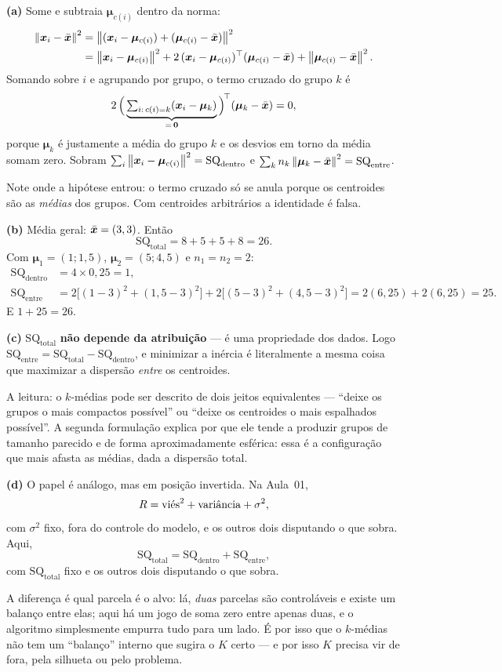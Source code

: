 \documentclass[11pt,a4paper]{article}
\begin{document}
\begin{solucao}
\textbf{(a)} Some e subtraia $\bm\mu_{c(i)}$ dentro da norma:
\[
\begin{aligned}
  \left\lVert \bm{x}_i-\bar{\bm{x}} \right\rVert^2 &= \left\lVert (\bm{x}_i-\bm\mu_{c(i)}) + (\bm\mu_{c(i)}-\bar{\bm{x}}) \right\rVert^2\\
  &= \left\lVert \bm{x}_i-\bm\mu_{c(i)} \right\rVert^2 + 2\,(\bm{x}_i-\bm\mu_{c(i)})^\top(\bm\mu_{c(i)}-\bar{\bm{x}})
    + \left\lVert \bm\mu_{c(i)}-\bar{\bm{x}} \right\rVert^2 .
\end{aligned}
\]
Somando sobre $i$ e agrupando por grupo, o termo cruzado do grupo $k$ é
\[
  2\,\Big(\underbrace{\textstyle\sum_{i:\,c(i)=k}(\bm{x}_i-\bm\mu_k)}_{=\,\bm 0}\Big)^{\!\top}
  (\bm\mu_k-\bar{\bm{x}}) = 0 ,
\]
porque $\bm\mu_k$ é justamente a média do grupo $k$ e os desvios em torno da
média somam zero. Sobram
$\sum_i\left\lVert \bm{x}_i-\bm\mu_{c(i)} \right\rVert^2 = \mathrm{SQ}_{\text{dentro}}$ e
$\sum_k n_k\left\lVert \bm\mu_k-\bar{\bm{x}} \right\rVert^2 = \mathrm{SQ}_{\text{entre}}$.

Note onde a hipótese entrou: o termo cruzado só se anula porque os centroides são
as \emph{médias} dos grupos. Com centroides arbitrários a identidade é falsa.

\smallskip
\textbf{(b)} Média geral: $\bar{\bm{x}} = (3,3)$. Então
\[
  \mathrm{SQ}_{\text{total}} = 8+5+5+8 = 26 .
\]
Com $\bm\mu_1=(1;1{,}5)$, $\bm\mu_2=(5;4{,}5)$ e $n_1=n_2=2$:
\[
\begin{aligned}
  \mathrm{SQ}_{\text{dentro}} &= 4\times 0{,}25 = 1,\\
  \mathrm{SQ}_{\text{entre}} &= 2\big[(1-3)^2+(1{,}5-3)^2\big] + 2\big[(5-3)^2+(4{,}5-3)^2\big]
   = 2(6{,}25)+2(6{,}25) = 25 .
\end{aligned}
\]
E $1 + 25 = 26$. \checkmark

\smallskip
\textbf{(c)} $\mathrm{SQ}_{\text{total}}$ \textbf{não depende da atribuição} ---
é uma propriedade dos dados. Logo
$\mathrm{SQ}_{\text{entre}} = \mathrm{SQ}_{\text{total}} - \mathrm{SQ}_{\text{dentro}}$,
e minimizar a inércia é literalmente a mesma coisa que maximizar a dispersão
\emph{entre} os centroides.

A leitura: o $k$-médias pode ser descrito de dois jeitos equivalentes ---
``deixe os grupos o mais compactos possível'' ou ``deixe os centroides o mais
espalhados possível''. A segunda formulação explica por que ele tende a produzir
grupos de tamanho parecido e de forma aproximadamente esférica: essa é a
configuração que mais afasta as médias, dada a dispersão total.

\smallskip
\textbf{(d)} O papel é análogo, mas em posição invertida. Na Aula~01,
\[
  R = \text{viés}^2 + \text{variância} + \sigma^2 ,
\]
com $\sigma^2$ fixo, fora do controle do modelo, e os outros dois disputando o
que sobra. Aqui,
\[
  \mathrm{SQ}_{\text{total}} = \mathrm{SQ}_{\text{dentro}} + \mathrm{SQ}_{\text{entre}} ,
\]
com $\mathrm{SQ}_{\text{total}}$ fixo e os outros dois disputando o que sobra.

A diferença é qual parcela é o alvo: lá, \emph{duas} parcelas são
controláveis e existe um balanço entre elas; aqui há um jogo de soma zero entre
apenas duas, e o algoritmo simplesmente empurra tudo para um lado. É por isso que
o $k$-médias não tem um ``balanço'' interno que sugira o $K$ certo --- e por isso
$K$ precisa vir de fora, pela silhueta ou pelo problema.
\end{solucao}
\end{document}
